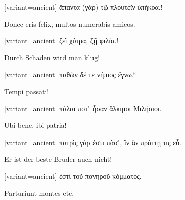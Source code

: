 \begin{greek}[variant=ancient]%
ἅπαντα (γὰρ) τῷ πλουτεῖν ὑπήκοα.!

\end{greek}%
\switchcolumn*

\begin{latin}%
Donec eris felix, multos numerabis amicos.

\end{latin}%
\switchcolumn

\begin{greek}[variant=ancient]%
ζεῖ χύτρα, ζῇ φιλία.!

\end{greek}%
\switchcolumn*

Durch Schaden wird man klug!

\switchcolumn

\begin{greek}[variant=ancient]%
\quotedblbase παθὼν δέ τε νήπιος ἔγνω.``

\end{greek}%
\switchcolumn*

\begin{latin}%
Tempi passati!

\end{latin}%
\switchcolumn

\begin{greek}[variant=ancient]%
πάλαι ποτ᾽ ἦσαν ἄλκιμοι Μιλήσιοι.

\end{greek}%
\switchcolumn*

\begin{latin}%
Ubi bene, ibi patria!

\end{latin}%
\switchcolumn

\begin{greek}[variant=ancient]%
πατρὶς γάρ ἐστι πᾶσ᾽, ἵν ἂν πράττῃ τις εὖ.

\end{greek}%
\switchcolumn*

Er ist der beste Bruder auch nicht!

\switchcolumn

\begin{greek}[variant=ancient]%
ἐστὶ τοῦ πονηροῦ κόμματος.

\end{greek}%
\switchcolumn*

\begin{latin}%
Parturiunt montes etc.

\end{latin}%
\switchcolumn

